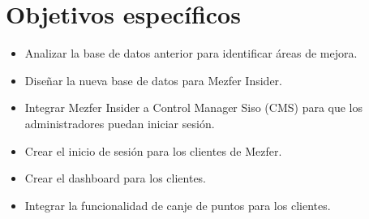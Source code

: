 \section{Objetivos específicos}
\begin{itemize}
    \item Analizar la base de datos anterior para identificar áreas de mejora.
    \item Diseñar la nueva base de datos para Mezfer Insider.
    \item Integrar Mezfer Insider a Control Manager Siso (CMS) para que los administradores puedan iniciar sesión.
    \item Crear el inicio de sesión para los clientes de Mezfer.
    \item Crear el dashboard para los clientes.
    \item Integrar la funcionalidad de canje de puntos para los clientes.
\end{itemize}